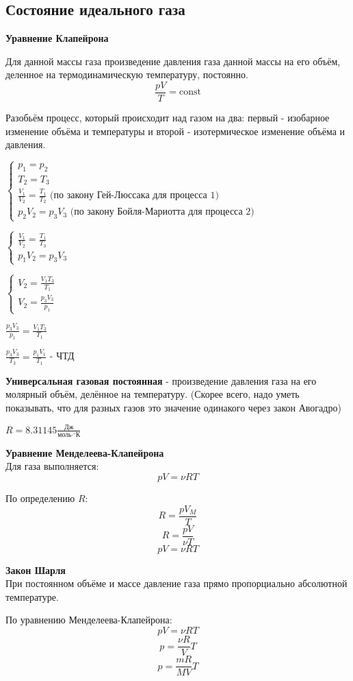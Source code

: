 \subsection{Состояние идеального газа}
\begin{oframed}
\textbf{Уравнение Клапейрона}\par
Для данной массы газа произведение давления газа данной массы на его объём, деленное на термодинамическую температуру, постоянно.
\[\frac{pV}{T}=\text{const}\]
\end{oframed}
Разобьём процесс, который происходит над газом на два: первый - изобарное изменение объёма и температуры и второй - изотермическое изменение объёма и давления.\par
$\displaystyle \begin{cases}
	p_1 = p_2 \\
	T_2 = T_3 \\
	\frac{V_1}{V_2}=\frac{T_1}{T_2} \text{ (по закону Гей-Люссака для процесса 1)} \\
	p_2 V_2 = p_3 V_3 \text{ (по закону Бойля-Мариотта для процесса 2)}
\end{cases}$\par\medskip
$\displaystyle \begin{cases}
	\frac{V_1}{V_2}=\frac{T_1}{T_3} \\
	p_1 V_2 = p_3 V_3
\end{cases}$\par\medskip
$\displaystyle \begin{cases}
	V_2=\frac{V_1 T_3}{T_1} \\
	V_2=\frac{p_3 V_3}{p_1}
\end{cases}$\par\medskip
$\displaystyle \frac{p_3 V_3}{p_1}=\frac{V_1 T_3}{T_1}$\par\medskip
$\displaystyle \frac{p_3 V_3}{T_3}=\frac{p_1 V_1}{T_1}$ - ЧТД\par
\bigskip
\textbf{Универсальная газовая постоянная} - произведение давления газа на его молярный объём, делённое на температуру. (Скорее всего, надо уметь показывать, что для разных газов это значение одинакого через закон Авогадро)\par
$R = 8.31145 \textstyle \frac{\text{Дж}}{\text{моль} \cdot ^\circ \text{К}}$

\begin{oframed}
\textbf{Уравнение Менделеева-Клапейрона}\\
Для газа выполняется:
\[pV=\nu R T\]
\end{oframed}
По определению $R$:
\[R=\frac{pV_M}{T}\]
\[R=\frac{pV}{\nu T}\]
\[pV = \nu R T\]

\begin{oframed}
\textbf{Закон Шарля}\\
При постоянном объёме и массе давление газа прямо пропорциально абсолютной температуре.
\end{oframed}
По уравнению Менделеева-Клапейрона:
\[pV=\nu R T\]
\[p=\frac{\nu R}{V} T\]
\[p=\frac{m R}{M V} T\]